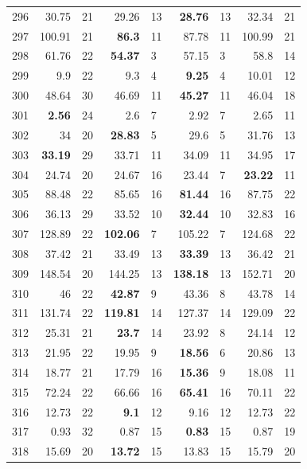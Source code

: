 \begin{longtable}{lr@{\hskip 4pt}l@{\hskip 12pt}r@{\hskip 4pt}l@{\hskip 12pt}r@{\hskip 4pt}l@{\hskip 12pt}r@{\hskip 4pt}l@{\hskip 12pt}}
296 & 30.75 & 21 & 29.26 & 13 & \textbf{28.76} & 13 & 32.34 & 21 \\
297 & 100.91 & 21 & \textbf{86.3} & 11 & 87.78 & 11 & 100.99 & 21 \\
298 & 61.76 & 22 & \textbf{54.37} & 3 & 57.15 & 3 & 58.8 & 14 \\
299 & 9.9 & 22 & 9.3 & 4 & \textbf{9.25} & 4 & 10.01 & 12 \\
300 & 48.64 & 30 & 46.69 & 11 & \textbf{45.27} & 11 & 46.04 & 18 \\
301 & \textbf{2.56} & 24 & 2.6 & 7 & 2.92 & 7 & 2.65 & 11 \\
302 & 34 & 20 & \textbf{28.83} & 5 & 29.6 & 5 & 31.76 & 13 \\
303 & \textbf{33.19} & 29 & 33.71 & 11 & 34.09 & 11 & 34.95 & 17 \\
304 & 24.74 & 20 & 24.67 & 16 & 23.44 & 7 & \textbf{23.22} & 11 \\
305 & 88.48 & 22 & 85.65 & 16 & \textbf{81.44} & 16 & 87.75 & 22 \\
306 & 36.13 & 29 & 33.52 & 10 & \textbf{32.44} & 10 & 32.83 & 16 \\
307 & 128.89 & 22 & \textbf{102.06} & 7 & 105.22 & 7 & 124.68 & 22 \\
308 & 37.42 & 21 & 33.49 & 13 & \textbf{33.39} & 13 & 36.42 & 21 \\
309 & 148.54 & 20 & 144.25 & 13 & \textbf{138.18} & 13 & 152.71 & 20 \\
310 & 46 & 22 & \textbf{42.87} & 9 & 43.36 & 8 & 43.78 & 14 \\
311 & 131.74 & 22 & \textbf{119.81} & 14 & 127.37 & 14 & 129.09 & 22 \\
312 & 25.31 & 21 & \textbf{23.7} & 14 & 23.92 & 8 & 24.14 & 12 \\
313 & 21.95 & 22 & 19.95 & 9 & \textbf{18.56} & 6 & 20.86 & 13 \\
314 & 18.77 & 21 & 17.79 & 16 & \textbf{15.36} & 9 & 18.08 & 11 \\
315 & 72.24 & 22 & 66.66 & 16 & \textbf{65.41} & 16 & 70.11 & 22 \\
316 & 12.73 & 22 & \textbf{9.1} & 12 & 9.16 & 12 & 12.73 & 22 \\
317 & 0.93 & 32 & 0.87 & 15 & \textbf{0.83} & 15 & 0.87 & 19 \\
318 & 15.69 & 20 & \textbf{13.72} & 15 & 13.83 & 15 & 15.79 & 20 \\
\bottomrule
\end{longtable}